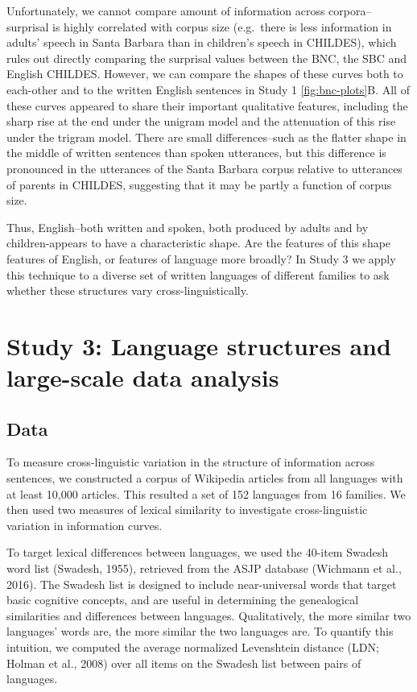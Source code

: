 \documentclass[man,floatsintext]{apa6}
\begin{document}
Unfortunately, we cannot compare amount of information across corpora--surprisal is highly correlated with corpus size (e.g.~there is less information in adults' speech in Santa Barbara than in children's speech in CHILDES), which rules out directly comparing the surprisal values between the BNC, the SBC and English CHILDES. However, we can compare the shapes of these curves both to each-other and to the written English sentences in Study 1 \ref{fig:bnc-plots}B. All of these curves appeared to share their important qualitative features, including the sharp rise at the end under the unigram model and the attenuation of this rise under the trigram model. There are small differences--such as the flatter shape in the middle of written sentences than spoken utterances, but this difference is pronounced in the utterances of the Santa Barbara corpus relative to utterances of parents in CHILDES, suggesting that it may be partly a function of corpus size.

Thus, English--both written and spoken, both produced by adults and by children-appears to have a characteristic shape. Are the features of this shape features of English, or features of language more broadly? In Study 3 we apply this technique to a diverse set of written languages of different families to ask whether these structures vary cross-linguistically.

\hypertarget{study-3-language-structures-and-large-scale-data-analysis}{%
\section{Study 3: Language structures and large-scale data analysis}\label{study-3-language-structures-and-large-scale-data-analysis}}

\hypertarget{data-2}{%
\subsection{Data}\label{data-2}}

To measure cross-linguistic variation in the structure of information across sentences, we constructed a corpus of Wikipedia articles from all languages with at least 10,000 articles. This resulted a set of 152 languages from 16 families. We then used two measures of lexical similarity to investigate cross-linguistic variation in information curves.

To target lexical differences between languages, we used the 40-item Swadesh word list (Swadesh, 1955), retrieved from the ASJP database (Wichmann et al., 2016). The Swadesh list is designed to include near-universal words that target basic cognitive concepts, and are useful in determining the genealogical similarities and differences between languages. Qualitatively, the more similar two languages' words are, the more similar the two languages are. To quantify this intuition, we computed the average normalized Levenshtein distance (LDN; Holman et al., 2008) over all items on the Swadesh list between pairs of languages.
\end{document}

